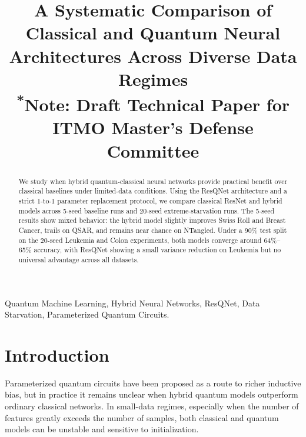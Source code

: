 \documentclass[conference]{IEEEtran}
\begin{document}
\title{A Systematic Comparison of Classical and Quantum Neural Architectures Across Diverse Data Regimes\\
{\footnotesize \textsuperscript{*}Note: Draft Technical Paper for ITMO Master's Defense Committee}}

\author{
\and
{}
}

\maketitle

\begin{abstract}
We study when hybrid quantum-classical neural networks provide practical benefit over classical baselines under limited-data conditions. Using the ResQNet architecture and a strict 1-to-1 parameter replacement protocol, we compare classical ResNet and hybrid models across 5-seed baseline runs and 20-seed extreme-starvation runs. The 5-seed results show mixed behavior: the hybrid model slightly improves Swiss Roll and Breast Cancer, trails on QSAR, and remains near chance on NTangled. Under a 90\% test split on the 20-seed Leukemia and Colon experiments, both models converge around 64\%--65\% accuracy, with ResQNet showing a small variance reduction on Leukemia but no universal advantage across all datasets.
\end{abstract}

\begin{IEEEkeywords}
Quantum Machine Learning, Hybrid Neural Networks, ResQNet, Data Starvation, Parameterized Quantum Circuits.
\end{IEEEkeywords}

\section{Introduction}
Parameterized quantum circuits have been proposed as a route to richer inductive bias, but in practice it remains unclear when hybrid quantum models outperform ordinary classical networks. In small-data regimes, especially when the number of features greatly exceeds the number of samples, both classical and quantum models can be unstable and sensitive to initialization.
\end{document}
